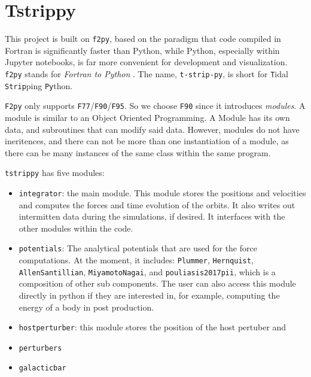 \documentclass{article}
\begin{document}
\section{Tstrippy}
    This project is built on \texttt{f2py}, based on the paradigm that code compiled in Fortran is significantly faster than Python, while Python, especially within Jupyter notebooks, is far more convenient for development and visualization. \texttt{f2py} stands for \textit{Fortran to Python} \citep{peterson2009f2py}. The name, \texttt{t-strip-py}, is short for \texttt{T}idal \texttt{Strip}ping \texttt{Py}thon. 

    \texttt{F2py} only supports \texttt{F77}/\texttt{F90}/\texttt{F95}. So we choose \texttt{F90} since it introduces \textit{modules}. A module is similar to an Object Oriented Programming. A Module has its own data, and subroutines that can modify said data. However, modules do not have ineritences, and there can not be more than one instantiation of a module, as there can be many instances of the same class within the same program. 

    \texttt{tstrippy} has five modules:
    \begin{itemize}
        \item \texttt{integrator}: the main module. This module stores the positions and velocities and computes the forces and time evolution of the orbits. It also writes out intermitten data during the simulations, if desired. It interfaces with the other modules within the code. 
        \item \texttt{potentials}: The analytical potentials that are used for the force computations. At the moment, it includes: \texttt{Plummer}, \texttt{Hernquist}, \texttt{AllenSantillian}, \texttt{MiyamotoNagai}, and \texttt{pouliasis2017pii}, which is a composition of other sub components. The user can also access this module directly in python if they are interested in, for example, computing the energy of a body in post production.
        \item \texttt{hostperturber}: this module stores the position of the host pertuber and  
        \item \texttt{perturbers}
        \item \texttt{galacticbar}
    \end{itemize}
\end{document}
